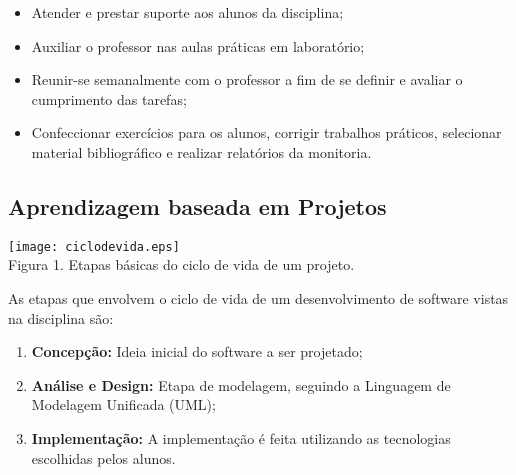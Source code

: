 \documentclass[a0, portrait, final]{a0poster}
\begin{document}
\begin{multicols}{3}
\begin{spacing}{3.0}
\begin{itemize}
	\item {\large Atender e prestar suporte aos alunos da disciplina;}
	\item {\large Auxiliar o professor nas aulas práticas em laboratório;}
	\item {\large Reunir-se semanalmente com o professor a fim de se definir e avaliar o cumprimento das tarefas;}
	\item {\large Confeccionar exercícios para os alunos, corrigir trabalhos práticos, selecionar material bibliográfico e realizar relatórios da monitoria.}
\end{itemize}
\end{spacing}



\subsection{Aprendizagem baseada em Projetos}
\begin{center}
	\texttt{[image: ciclodevida.eps]}\\
	{\normalsize Figura 1. Etapas básicas do ciclo de vida de um projeto.}\\
\end{center}
\vspace{1.8cm}

\begin{spacing}{3.0}
	{\large As etapas que envolvem o ciclo de vida de um desenvolvimento de software vistas na disciplina são:}
\end{spacing}

\begin{spacing}{1.0}
\begin{large}
\begin{enumerate}
	\item \textbf{Concepção: }Ideia inicial do software a ser projetado;
	\item \textbf{Análise e Design: }Etapa de modelagem, seguindo a Linguagem de Modelagem Unificada (UML);
	\item \textbf{Implementação: }A implementação é feita utilizando as tecnologias escolhidas pelos alunos.
\end{enumerate}
\end{large}
\end{spacing}

\vspace{1.5cm}


\end{multicols}
\end{document}
